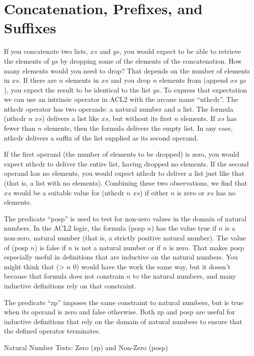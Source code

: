 \section{Concatenation, Prefixes, and Suffixes}
\label{sec:append-prefix-suffix}

If you concatenate two lists, $xs$ and $ys$,
you would expect to be able to retrieve the elements
of $ys$ by dropping some of the elements of the concatenation.
How many elements would you need to drop?
That depends on the number of elements in $xs$.
If there are $n$ elements in $xs$ and you drop $n$ elements
from (append $xs$ $ys$), you expect the result to be identical
to the list $ys$. To express that expectation we can use
an intrinsic operator in ACL2 with the arcane name ``nthcdr''.
The nthcdr operator has two operands: a natural number and a list.
The formula (nthcdr $n$ $xs$) delivers a list like $xs$,
but without its first $n$ elements.
If $xs$ has fewer than $n$ elements,
then the formula delivers the empty list.
In any case, nthcdr delivers a suffix of the list
supplied as its second operand.

If the first operand (the number of elements to be dropped) is zero,
you would expect
nthcdr to deliver the entire list, having dropped no elements.
If the second operand has no elements,
you would expect
nthcdr to deliver a list just like that
(that is, a list with no elements).
Combining these two observations, we find that
$xs$ would be a suitable value for (nthcdr $n$ $xs$)
if either $n$ is zero or $xs$ has no elements.

\begin{aside}
The predicate ``posp'' is used to test for non-zero values
in the domain of natural numbers.
In the ACL2 logic, the formula (posp $n$) has the value true if $n$ is
a non-zero, natural number (that is, a strictly positive natural number).
The value of (posp $n$) is false if $n$ is not a natural number
or if $n$ is zero.
That makes posp especially useful
in definitions that are inductive on the natural numbers.
You might think that (> $n$ 0) would have the
work the same way, but it doesn't because that formula
does not constrain $n$ to the natural numbers,
and many inductive definitions rely on that constraint.

The predicate ``zp'' imposes the same constraint to natural numbers,
but is true when its operand is zero and false otherwise.
Both zp and posp are useful for inductive definitions that
rely on the domain of natural numbers to ensure that the
defined operator terminates.
\caption{Natural Number Tests: Zero (zp) and Non-Zero (posp)}
\label{zp-def}
\end{aside}

